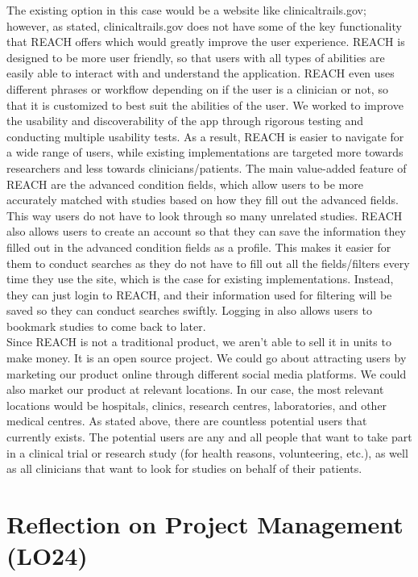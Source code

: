 \documentclass{article}
\begin{document}
The existing option in this case would be a website like clinicaltrails.gov; however, as stated, 
clinicaltrails.gov does not have some of the key functionality that REACH offers which would greatly 
improve the user experience. REACH is designed to be more user friendly, so that users with all types 
of abilities are easily able to interact with and understand the application. REACH even uses different 
phrases or workflow depending on if the user is a clinician or not, so that it is customized to best 
suit the abilities of the user. We worked to improve the usability and discoverability of the app 
through rigorous testing and conducting multiple usability tests. As a result, REACH is easier to 
navigate for a wide range of users, while existing implementations are targeted more towards 
researchers and less towards clinicians/patients. The main value-added feature of REACH are the 
advanced condition fields, which allow users to be more accurately matched with studies based on how 
they fill out the advanced fields. This way users do not have to look through so many unrelated studies. 
REACH also allows users to create an account so that they can save the information they filled out in 
the advanced condition fields as a profile. This makes it easier for them to conduct searches as they 
do not have to fill out all the fields/filters every time they use the site, which is the case for 
existing implementations. Instead, they can just login to REACH, and their information used for 
filtering will be saved so they can conduct searches swiftly. Logging in also allows users to bookmark 
studies to come back to later.\\

Since REACH is not a traditional product, we aren't able to sell it in units to make money. It is an 
open source project. We could go about attracting users by marketing our product online through 
different social media platforms. We could also market our product at relevant locations. In our case, 
the most relevant locations would be hospitals, clinics, research centres, laboratories, and other 
medical centres. As stated above, there are countless potential users that currently exists. The 
potential users are any and all people that want to take part in a clinical trial or research study 
(for health reasons, volunteering, etc.), as well as all clinicians that want to look for studies on 
behalf of their patients.

\section{Reflection on Project Management (LO24)}
\end{document}
